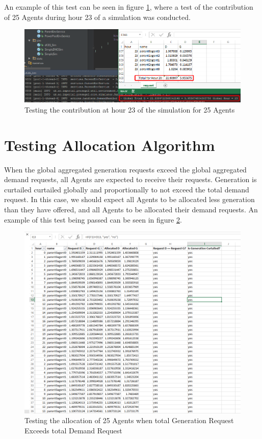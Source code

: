 An example of this test can be seen in figure \ref{fig:test1}, where a test of the contribution of 25 Agents during hour 23 of a simulation was conducted.

\clearpage

\begin{figure}[h!]
	\centering
	\includegraphics[scale=0.4]{Images/test-contribution.png}
	\caption{Testing the contribution at hour 23 of the simulation for 25 Agents}
	\label{fig:test1}
\end{figure}

\section*{Testing Allocation Algorithm}
When the global aggregated generation requests exceed the global aggregated demand requests, all Agents are expected to receive their requests. Generation is curtailed curtailed globally and proportionally to not exceed the total demand request. In this case, we should expect all Agents to be allocated less generation than they have offered, and all Agents to be allocated their demand requests. An example of this test being passed can be seen in figure \ref{fig:test2}. \\

\begin{figure}[h!]
	\centering
	\includegraphics[scale=0.4]{Images/test-allocation1.png}
	\caption{Testing the allocation of 25 Agents when total Generation Request Exceeds total Demand Request}
	\label{fig:test2}
\end{figure}

